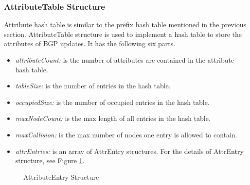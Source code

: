 \subsubsection{AttributeTable Structure}
\label{sec:labeling:attributetable}
Attribute hash table is similar to the prefix hash table mentioned in the previous section. AttributeTable structure is used to implement a hash table to store the attributes of BGP updates. It has the following six parts.
\begin{itemize}
\item{\emph{attributeCount:} is the number of attributes are contained in the attribute hash table.}
\item{\emph{tableSize:} is the number of entries in the hash table.}
\item{\emph{occupiedSize:} is the number of occupied entries in the hash table. }
\item{\emph{maxNodeCount:} is the max length of all entries in the hash table.}
\item{\emph{maxCollision:} is the max number of nodes one entry is allowed to contain.}
\item{\emph{attrEntries:} is an array of AttrEntry structures. For the details of AttrEntry structure, see Figure \ref{fig:AttributeEntryStruct}.}
\end{itemize}
\begin{figure}
\centering
{}
\caption{AttributeEntry Structure}
\label{fig:AttributeEntryStruct}
\end{figure}
